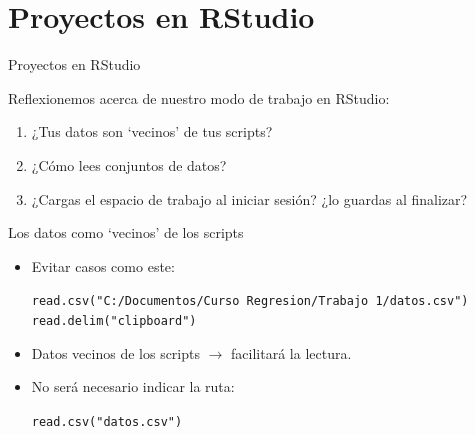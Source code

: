 \documentclass[
  ignorenonframetext,
  aspectratio=169]{beamer}
\begin{document}
\hypertarget{proyectos-en-rstudio}{%
\section{Proyectos en RStudio}\label{proyectos-en-rstudio}}

\begin{frame}{Proyectos en RStudio}

Reflexionemos acerca de nuestro modo de trabajo en RStudio:

\begin{enumerate}
\item
  ¿Tus datos son `vecinos' de tus scripts?
\item
  ¿Cómo lees conjuntos de datos?
\item
  ¿Cargas el espacio de trabajo al iniciar sesión? ¿lo guardas al
  finalizar?
\end{enumerate}

\end{frame}

\begin{frame}

\begin{block}{Los datos como `vecinos' de los scripts}

\begin{itemize}
\item
  Evitar casos como este:

  \begin{center}
  \texttt{read.csv("C:/Documentos/Curso Regresion/Trabajo 1/datos.csv")}
  \texttt{read.delim("clipboard")}
  \end{center}
\item
  Datos vecinos de los scripts \(\rightarrow\) facilitará la lectura.
\item
  No será necesario indicar la ruta:

  \begin{center}
  \texttt{read.csv("datos.csv")}
  \end{center}
\end{itemize}

\end{block}

\end{frame}
\end{document}
